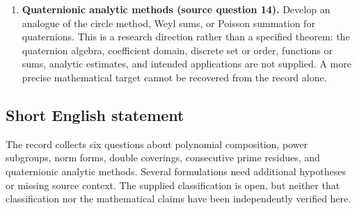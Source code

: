 \documentclass[11pt]{article}
\begin{document}
\begin{enumerate}
\item \textbf{Quaternionic analytic methods (source question 14).} Develop an analogue of the circle method, Weyl sums, or Poisson summation for quaternions. This is a research direction rather than a specified theorem: the quaternion algebra, coefficient domain, discrete set or order, functions or sums, analytic estimates, and intended applications are not supplied. A more precise mathematical target cannot be recovered from the record alone.
\end{enumerate}
\subsection{Short English statement}
The record collects six questions about polynomial composition, power subgroups, norm forms, double coverings, consecutive prime residues, and quaternionic analytic methods. Several formulations need additional hypotheses or missing source context. The supplied classification is open, but neither that classification nor the mathematical claims have been independently verified here.
\end{document}
